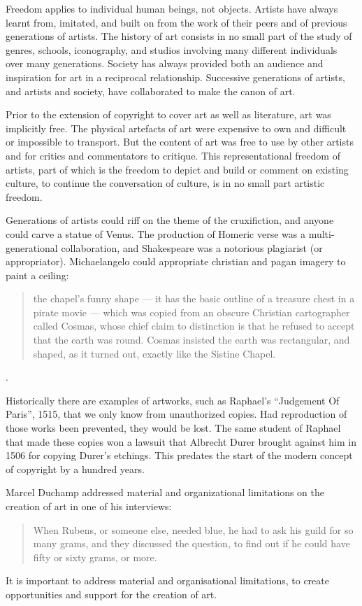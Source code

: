 \documentclass[11pt, a4]{article}
\begin{document}
Freedom applies to individual human beings, not objects. Artists have always learnt from, imitated, and built on from the work of their peers and of previous generations of artists. The history of art consists in no small part of the study of genres, schools, iconography, and studios involving many different individuals over many generations. Society has always provided both an audience and inspiration for art in a reciprocal relationship. Successive generations of artists, and artists and society, have collaborated to make the canon of art.

Prior to the extension of copyright to cover art as well as literature, art was implicitly free. The physical artefacts of art were expensive to own and difficult or impossible to transport. But the content of art was free to use by other artists and for critics and commentators to critique. This representational freedom of artists, part of which is the freedom to depict and build or comment on existing culture, to continue the conversation of culture, is in no small part artistic freedom.

Generations of artists could riff on the theme of the cruxifiction, and anyone could carve a statue of Venus. The production of Homeric verse was a multi-generational collaboration, and Shakespeare was a notorious plagiarist (or appropriator). Michaelangelo could appropriate christian and pagan imagery to paint a ceiling:
\begin{quote} 
the chapel’s funny shape — it has the basic outline of a treasure chest in a pirate movie — which was copied from an obscure Christian cartographer called Cosmas, whose chief claim to distinction is that he refused to accept that the earth was round. Cosmas insisted the earth was rectangular, and shaped, as it turned out, exactly like the Sistine Chapel.
\end{quote} \cite{Januszczak2005}. 

Historically there are examples of artworks, such as Raphael's ``Judgement Of Paris'', 1515, that we only know from unauthorized copies. Had reproduction of those works been prevented, they would be lost. The same student of Raphael that made these copies won a lawsuit that Albrecht Durer brought against him in 1506 for copying Durer's etchings\cite{McClean2002}. This predates the start of the modern concept of copyright by a hundred years.

Marcel Duchamp addressed material and organizational limitations on the creation of art in one of his interviews:
\begin{quote}When Rubens, or someone else, needed blue, he had to ask his guild for so many grams, and they discussed the question, to find out if he could have fifty or sixty grams, or more.\end{quote} \cite{Cabanne1987}  It is important to address material and organisational limitations, to create opportunities and support for the creation of art.
\end{document}
